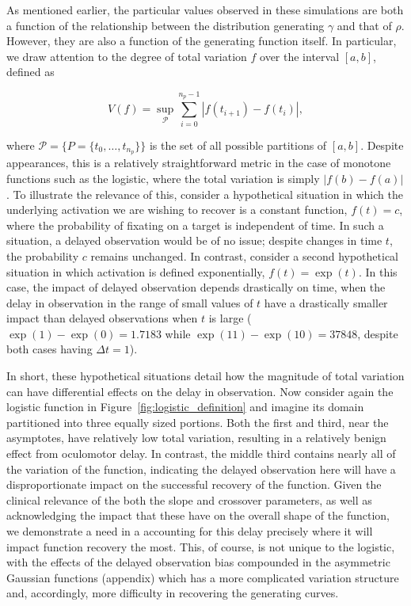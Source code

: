 As mentioned earlier, the particular values observed in these simulations are both a function of the relationship between the distribution generating $\gamma$ and that of $\rho$. However, they are also a function of the generating function itself. In particular, we draw attention to the degree of total variation $f$ over the interval $[a,b]$, defined as 

\begin{equation}
V(f) = \underset{\mathcal{P}}{\sup} \sum_{i=0}^{n_p-1} \left|f(t_{i+1}) - f(t_i) \right|,
\end{equation}

where $\mathcal{P} = \{P = \{t_0, \dots, t_{n_p}\} \}$ is the set of all possible partitions of $[a,b]$. Despite appearances, this is a relatively straightforward metric in the case of monotone functions such as the logistic, where the total variation is simply $|f(b) - f(a)|$. To illustrate the relevance of this, consider a hypothetical situation in which the underlying activation we are wishing to recover is a constant function, $f(t) = c$, where the probability of fixating on a target is independent of time. In such a situation, a delayed observation would be of no issue; despite changes in time $t$, the probability $c$ remains unchanged. In contrast, consider a second hypothetical situation in which activation is defined exponentially, $f(t) = \exp(t)$. In this case, the impact of delayed observation depends drastically on time, when the delay in observation in the range of small values of $t$ have a drastically smaller impact than delayed observations when $t$ is large ($\exp(1) - \exp(0) = 1.7183$ while $\exp(11) - \exp(10) = 37848$, despite both cases having $\Delta t = 1$).

In short, these hypothetical situations detail how the magnitude of total variation can have differential effects on the delay in observation. Now consider again the logistic function in Figure~\ref{fig:logistic_definition} and imagine its domain partitioned into three equally sized portions. Both the first and third, near the asymptotes, have relatively low total variation, resulting in a relatively benign effect from oculomotor delay. In contrast, the middle third contains nearly all of the variation of the function, indicating the delayed observation here will have a disproportionate impact on the successful recovery of the function. Given the clinical relevance of the both the slope and crossover parameters, as well as acknowledging the impact that these have on the overall shape of the function, we demonstrate a need in a accounting for this delay precisely where it will impact function recovery the most. This, of course, is not unique to the logistic, with the effects of the delayed observation bias compounded in the asymmetric Gaussian functions (appendix) which has a more complicated variation structure and, accordingly, more difficulty in recovering the generating curves.








